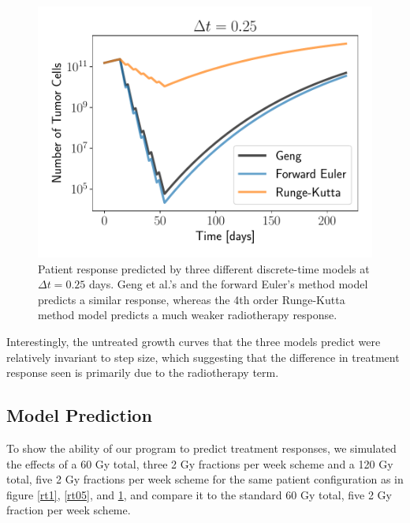 \documentclass[letterpaper
, superscriptaddress
, twocolumn
, aps
]{revtex4}
\begin{document}
\begin{figure}
	\includegraphics[width=1.00\columnwidth]{Figures/responsedt25.pdf}
	\caption{Patient response predicted by three different discrete-time models at $\Delta t = 0.25$ days. Geng et al.'s and the forward Euler's method model predicts a similar response, whereas the 4th order Runge-Kutta method model predicts a much weaker radiotherapy response.}
	\label{rt25}
\end{figure}

Interestingly, the untreated growth curves that the three models predict were relatively invariant to step size, which suggesting that the difference in treatment response seen is primarily due to the radiotherapy term.

\subsection{Model Prediction}
To show the ability of our program to predict treatment responses, we simulated the effects of a 60 Gy total, three 2 Gy fractions per week scheme and a 120 Gy total, five 2 Gy fractions per week scheme for the same patient configuration as in figure \ref{rt1}, \ref{rt05}, and \ref{rt25}, and compare it to the standard 60 Gy total, five 2 Gy fraction per week scheme.
\end{document}

